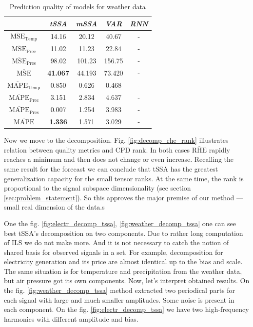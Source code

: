 	\def\arraystretch{1.1}
	\begin{table}[h]
		\centering
		\caption{Prediction quality of models for weather data}\label{tab:pred_res_weather}
		\begin{tabular}{|c|c|c|c|c|}
			\hline
			& \textit{tSSA}                & \textit{mSSA} & \textit{VAR} & \textit{RNN} \\ \hline
			$ \overline{\text{MSE}}_{\text{Temp}} $  & 14.16                        & 20.12         & 40.67        & -            \\ \hline
			$ \overline{\text{MSE}}_{\text{Prec}} $  & 11.02                        & 11.23         & 22.84        & -            \\ \hline
			$ \overline{\text{MSE}}_{\text{Pres}} $  & 98.02                        & 101.23        & 156.75       & -            \\ \hline
			$ \overline{\text{MSE}} $        & \textbf{41.067}              & 44.193        & 73.420       & -            \\ \hline
			$ \overline{\text{MAPE}}_{\text{Temp}} $ & 0.850 & 0.626         & 0.468        & -            \\ \hline
			$ \overline{\text{MAPE}}_{\text{Prec}} $ & 3.151 & 2.834         & 4.637        & -            \\ \hline
			$ \overline{\text{MAPE}}_{\text{Pres}} $ & 0.007 & 1.254         & 3.983        & -            \\ \hline
			$ \overline{\text{MAPE}} $       & \textbf{1.336}               & 1.571         & 3.029        & -            \\ \hline
		\end{tabular}
	\end{table}
	
	Now we move to the decomposition. Fig. \ref{fig:decomp_rhe_rank} illustrates relation between quality metrics and CPD rank. In both cases $ \overline{\text{RHE}} $ rapidly reaches a minimum and then does not change or even increase. Recalling the same result for the forecast we can conclude that tSSA has the greatest generalization capacity for the small tensor ranks. At the same time, the rank is proportional to the signal subspace dimensionality (see section \ref{sec:problem_statement}). So this approves the major premise of our method --- small real dimension of the data.s
	
	One the fig. \ref{fig:electr_decomp_tssa}, \ref{fig:weather_decomp_tssa} one can see best tSSA's decomposition on two components. Due to rather long computation of ILS we do not make more. And it is not necessary to catch the notion of shared basis for observed signals in a set. For example, decomposition for electricity generation and its price are almost identical up to the bias and scale. The same situation is for temperature and precipitation from the weather data, but air pressure got its own components. Now, let's interpret obtained results. On the fig. \ref{fig:weather_decomp_tssa} method extracted two periodical parts for each signal with large and much smaller amplitudes. Some noise is present in each component. On the fig. \ref{fig:electr_decomp_tssa} we have two high-frequency harmonics with different amplitude and bias.	
	
